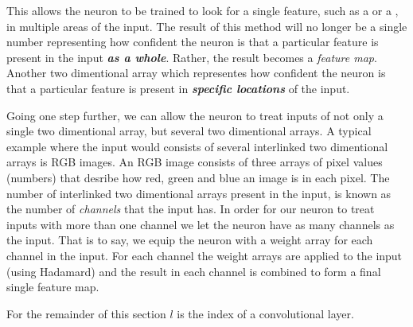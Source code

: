 This allows the neuron to be trained to look for a single feature, such as a  or a , in multiple areas of the input.
The result of this method will no longer be a single number representing how  confident the neuron is that a particular feature is present in the input {\em\bf as a whole}.
Rather, the result becomes a {\em feature map}.
Another two dimentional array which representes how  confident the neuron is that a particular feature is present in {\em\bf specific locations} of the input.

\startplacefigure[reference=conv-operation,
                   title={The basic forward operation of a convolutional layer.\par
                   Original available at: \url[conv-operation-source]},
                   location=top]
{}{}
{}{}
{}{}
{}{}
{}{}
{}{}
{}{}
{}{}
\stopcombination
\stopplacefigure

Going one step further, we can allow the neuron to treat inputs of not only a single two dimentional array, but several two dimentional arrays.
A typical example where the input would consists of several interlinked two dimentional arrays is RGB images.
An RGB image consists of three arrays of pixel values (numbers) that desribe how red, green and blue an image is in each pixel.
The number of interlinked two dimentional arrays present in the input, is known as the number of {\em channels} that the input has.
In order for our neuron to treat inputs with more than one channel we let the neuron have as many channels as the input.
That is to say, we equip the neuron with a weight array for each channel in the input.
For each channel the weight arrays are applied to the input (using Hadamard) and the result in each channel is combined to form a final single feature map.

For the remainder of this section $l$ is the index of a convolutional layer.

